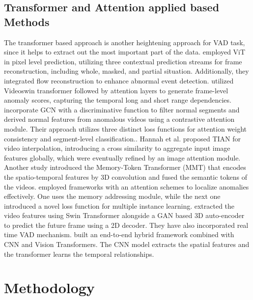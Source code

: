 \documentclass[runningheads]{llncs}
\begin{document}
\subsection{Transformer and Attention applied based Methods}
The transformer based approach is another heightening approach for VAD task, since it helps to extract out the most important part of the data. \cite{Multi-contextual} employed ViT in pixel level prediction,  utilizing three contextual prediction streams for frame reconstruction, including whole, masked, and partial situation. Additionally, they integrated flow reconstruction to  enhance abnormal event detection. \cite{attention-anomaly} utilized Videoswin transformer followed by attention layers to  generate frame-level anomaly scores, capturing the temporal long and short range dependencies. \cite{contrastive} incorporate GCN with a discriminative function to filter normal segments and derived normal features from anomalous videos using a contrastive attention module. Their approach utilizes three distinct loss functions for attention weight consistency and segment-level classification.. Hannah et al. \cite{Cross-attention} proposed TIAN for video interpolation, introducing a cross similarity to aggregate input image features globally, which were eventually refined by an image attention module. Another study \cite{Memory-Token} introduced the Memory-Token Transformer (MMT) that encodes the spatio-temporal features by 3D convolution and fused the semantic tokens of the videos. \cite{multi-view} employed frameworks with an attention schemes to localize anomalies effectively. One uses the memory addressing module, while the next one introduced a novel loss function for multiple instance learning. \cite{SwinAnomaly} extracted the video features using Swin Transformer alongside a GAN based 3D auto-encoder to predict the future frame using a 2D decoder. They have also incorporated real time VAD mechanism. \cite{TransCNN} built an end-to-end hybrid framework combined with CNN and Vision Transformers. The CNN model extracts the spatial features and the transformer learns the temporal relationships.

\section{Methodology}
\end{document}
